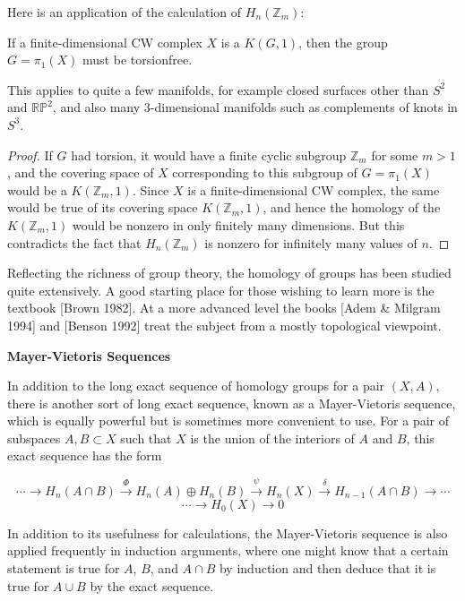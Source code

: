 Here is an application of the calculation of $H_n(\mathbb{Z}_m)$:

\begin{proposition}
\label{prop:fundamental-group-kg1-torsionfree}
If a finite-dimensional CW complex $X$ is a $K(G,1)$, then the group $G = \pi_1(X)$ must be torsionfree.
\end{proposition}

This applies to quite a few manifolds, for example closed surfaces other than $S^2$ and $\mathbb{RP}^2$, and also many 3-dimensional manifolds such as complements of knots in $S^3$.
\begin{proof}
 If $G$ had torsion, it would have a finite cyclic subgroup $\mathbb{Z}_m$ for some $m > 1$, and the covering space of $X$ corresponding to this subgroup of $G = \pi_1(X)$ would be a $K(\mathbb{Z}_m, 1)$. Since $X$ is a finite-dimensional CW complex, the same would be true of its covering space $K(\mathbb{Z}_m, 1)$, and hence the homology of the $K(\mathbb{Z}_m, 1)$ would be nonzero in only finitely many dimensions. But this contradicts the fact that $H_n(\mathbb{Z}_m)$ is nonzero for infinitely many values of $n$.
\end{proof}
Reflecting the richness of group theory, the homology of groups has been studied quite extensively. A good starting place for those wishing to learn more is the textbook [Brown 1982]. At a more advanced level the books [Adem \& Milgram 1994] and [Benson 1992] treat the subject from a mostly topological viewpoint.

\textbf{Mayer-Vietoris Sequences}

In addition to the long exact sequence of homology groups for a pair $(X,A)$, there is another sort of long exact sequence, known as a Mayer-Vietoris sequence, which is equally powerful but is sometimes more convenient to use. For a pair of subspaces $A, B \subset X$ such that $X$ is the union of the interiors of $A$ and $B$, this exact sequence has the form

\[ \cdots \to H_n(A \cap B) \xrightarrow{\Phi} H_n(A) \oplus H_n(B) \xrightarrow{\psi} H_n(X) \xrightarrow{\delta} H_{n-1}(A \cap B) \to \cdots \]
\[ \cdots \to H_0(X) \to 0 \]

In addition to its usefulness for calculations, the Mayer-Vietoris sequence is also applied frequently in induction arguments, where one might know that a certain statement is true for $A$, $B$, and $A \cap B$ by induction and then deduce that it is true for $A \cup B$ by the exact sequence.

